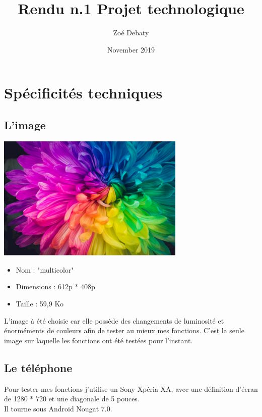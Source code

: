 \documentclass{article}
\title{Rendu n.1 Projet technologique}
\author{Zoé Debaty}
\date{November 2019}
\begin{document}
\maketitle
\tableofcontents 
\newpage

\section{Spécificités techniques}

\subsection{L'image}
\begin{center} 
    \includegraphics[width=9cm]{../multicolor}
    \end{center}

\begin{itemize}
\item Nom : "multicolor"
\item Dimensions : 612p * 408p
\item Taille : 59,9 Ko
\end{itemize}
\medbreak

L'image à été choisie car elle possède des changements de luminosité et énorméments de couleurs afin de tester au mieux mes fonctions.
C'est la seule image sur laquelle les fonctions ont été testées pour l'instant.

\subsection{Le téléphone}
Pour tester mes fonctions j'utilise un Sony Xpéria XA, avec une définition d'écran de 1280 * 720 et une diagonale de 5 pouces.\\
Il tourne sous Android Nougat 7.0.
\newpage

\end{document}
